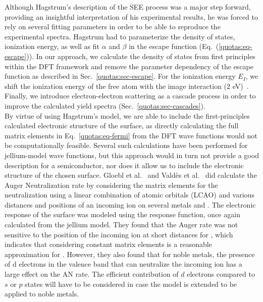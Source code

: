 \begin{refsection}
Although Hagstrum's description of the \gls{SEE} process was a major step forward, 
providing an insightful interpretation of his experimental results, he was 
forced to rely on several fitting parameters in order to be able to reproduce 
the experimental spectra. Hagstrum had to parameterize the density of states, 
ionization energy, as well as fit $\alpha$ and $\beta$ in the escape function 
(Eq.~(\ref{quotas:eq-escape})). In our approach, we calculate the density of 
states from first principles within the \gls{DFT} framework and remove the parameter 
dependency of the escape function as described in 
Sec.~\ref{quotas:sec-escape}. For the ionization energy $E_I$, we shift the 
ionization energy of the free atom with the image interaction (2 
\si{\electronvolt})~\cite{Baragiola1996, Riccardi2003}. Finally, we introduce 
electron-electron scattering as a cascade process in order to improve the 
calculated yield spectra (Sec.~\ref{quotas:sec-cascades}).\\ 
 
By virtue of using Hagstrum's model, we are able to include the 
first-principles calculated electronic structure of the surface, as directly 
calculating the full matrix elements in Eq.~\ref{quotas:eq-fermi} from the \gls{DFT} 
wave functions would not be computationally feasible. Several such 
calculations have been performed for jellium-model wave functions, but this 
approach would in turn not provide a good description for a semiconductor, nor 
does it allow us to include the electronic structure of the chosen surface. 
Gloebl et al.~\cite{Goebl2011, Goebl2013} and Vald\`es et 
al.~\cite{Valdes2006} did calculate the Auger Neutralization rate by 
considering the matrix elements for the neutralization using a linear 
combination of atomic orbitals (LCAO) and various distances and positions of 
an incoming  ion on several metals and . The electronic 
response of the surface was modeled using the response function, once again 
calculated from the jellium model. They found that the Auger rate was not 
sensitive to the position of the incoming ion at short distances for , 
which indicates that considering constant matrix elements is a reasonable 
approximation for . However, they also found that for noble metals, the 
presence of d electrons in the valence band that can neutralize the incoming 
ion has a large effect on the \gls{AN} rate. The efficient contribution of $d$ 
electrons compared to $s$ or $p$ states will have to be considered in case the 
model is extended to be applied to noble metals. 
 

\end{refsection}
